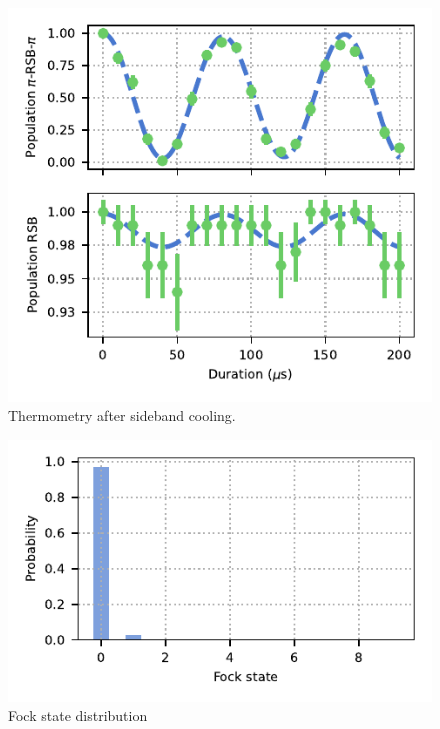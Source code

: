     \begin{figure}
        \begin{center}
        \noindent\includegraphics[width=\linewidth]{
            figures/pdf_figure/sideband_thermometry.pdf
            }
        \end{center}
        \caption{
            Thermometry after sideband cooling.
            }
        \label{fig:SBC}
    \end{figure}

    \begin{figure}
        \begin{center}
        \noindent\includegraphics[width=\linewidth]{
            figures/pdf_figure/fock_state_distribution.pdf
            }
        \end{center}
        \caption{
            Fock state distribution
            }
        \label{fig:fock state}
    \end{figure}


